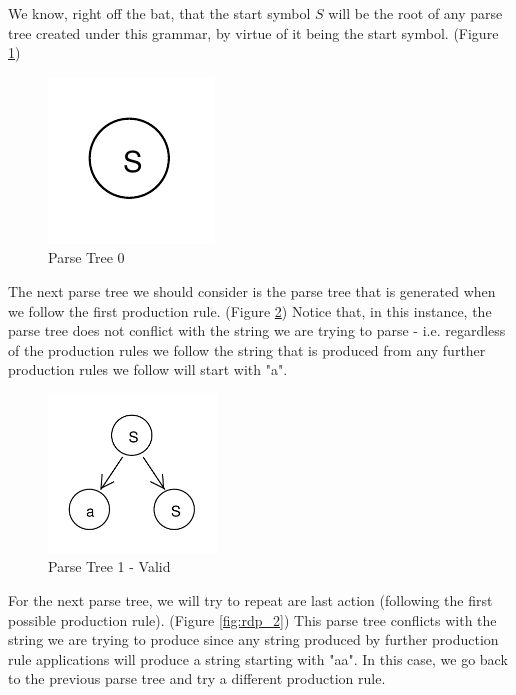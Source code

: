 \documentclass[11pt]{article}
\begin{document}
We know, right off the bat, that the start symbol $S$ will be the root of any parse tree created under this
grammar, by virtue of it being the start symbol. (Figure \ref{fig:rdp_0})

\begin{figure}[h!]
    \centering
    \includegraphics[natwidth=15,natheight=15]{umlet/rdp_0.pdf}
    \caption{Parse Tree 0}
    \label{fig:rdp_0}
\end{figure}

The next parse tree we should consider is the parse tree that is generated when we follow the first 
production rule. (Figure \ref{fig:rdp_1}) Notice that, in this instance, the parse tree does not conflict with
the string we are trying to parse - i.e. regardless of the production rules we follow the string that is
produced from any further production rules we follow will start with "a".

\begin{figure}[h!]
    \centering
    \includegraphics[width=0.4\textwidth,natwidth=30,natheight=30]{umlet/rdp_1.pdf}
    \caption{Parse Tree 1 - Valid}
    \label{fig:rdp_1}
\end{figure}

For the next parse tree, we will try to repeat are last action (following the first possible production rule).
(Figure \ref{fig:rdp_2}) This parse tree conflicts with the string we are trying to produce since any
string produced by further production rule applications will produce a string starting with "aa".
In this case, we go back to the previous parse tree and try a different production rule.
\end{document}
